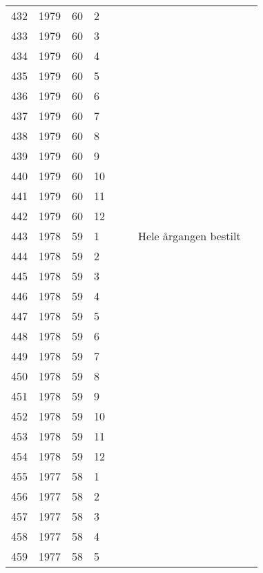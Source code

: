 \begin{longtable}{ |l|l|l|l|l|l|l|l| }
432 & 1979 & 60 &     2 &         &                &  & \\
433 & 1979 & 60 &     3 &         &                &  & \\
434 & 1979 & 60 &     4 &         &                &  & \\
435 & 1979 & 60 &     5 &         &                &  & \\
436 & 1979 & 60 &     6 &         &                &  & \\
437 & 1979 & 60 &     7 &         &                &  & \\
438 & 1979 & 60 &     8 &         &                &  & \\
439 & 1979 & 60 &     9 &         &                &  & \\
440 & 1979 & 60 &    10 &         &                &  & \\
441 & 1979 & 60 &    11 &         &                &  & \\
442 & 1979 & 60 &    12 &         &                &  & \\
443 & 1978 & 59 &     1 &         &                & Hele årgangen bestilt & \\
444 & 1978 & 59 &     2 &         &                &  & \\
445 & 1978 & 59 &     3 &         &                &  & \\
446 & 1978 & 59 &     4 &         &                &  & \\
447 & 1978 & 59 &     5 &         &                &  & \\
448 & 1978 & 59 &     6 &         &  &  & \\
449 & 1978 & 59 &     7 &         &  &  & \\
450 & 1978 & 59 &     8 &         &  &  & \\
451 & 1978 & 59 &     9 &         &  &  & \\
452 & 1978 & 59 &    10 &         &  &  & \\
453 & 1978 & 59 &    11 &         &  &  & \\
454 & 1978 & 59 &    12 &         &  &  & \\
455 & 1977 & 58 &     1 &         &  &  & \\
456 & 1977 & 58 &     2 &         &  &  & \\
457 & 1977 & 58 &     3 &         &  &  & \\
458 & 1977 & 58 &     4 &         &  &  & \\
459 & 1977 & 58 &     5 &         &  &  & \\

\end{longtable}
